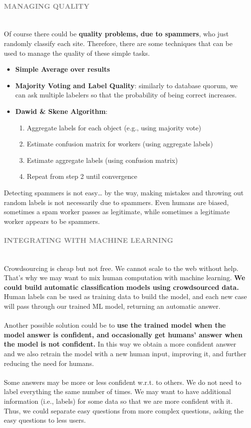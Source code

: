 \documentclass[10pt,a4paper]{article}
\newcommand{\nline}{\\~\\}
\newcommand{\myparagraph}[1]{\paragraph{\normalsize{\textcolor{gray}{\uppercase{\textbf{#1}}}} }\mbox{} \vspace{0.5em}\\}
\begin{document}
\myparagraph{Managing Quality}
Of course there could be \textbf{quality problems, due to spammers}, who just randomly classify each site. Therefore, there are some techniques that can be used to manage the quality of these simple tasks.
\begin{itemize}
	\item \textbf{Simple Average over results}
	\item \textbf{Majority Voting and Label Quality}: similarly to database quorum, we can ask multiple labelers so that the probability of being correct increases.
	\item \textbf{Dawid \& Skene Algorithm}:
	\begin{enumerate}
		\item Aggregate labels for each object (e.g., using majority vote)
		\item Estimate confusion matrix for workers (using aggregate labels)
		\item Estimate aggregate labels (using confusion matrix)
		\item Repeat from step 2 until convergence
	\end{enumerate}
\end{itemize}
Detecting spammers is not easy… by the way, making mistakes and throwing out random labels is not necessarily due to spammers. Even humans are biased, sometimes a spam worker passes as legitimate, while sometimes a legitimate worker appears to be spammers.

\myparagraph{Integrating with Machine Learning}
Crowdsourcing is cheap but not free. We cannot scale to the web without help. That’s why we may want to mix human computation with machine learning. \textbf{We could build automatic classification models using crowdsourced data.} Human labels can be used as training data to build the model, and each new case will pass through our trained ML model, returning an automatic answer.
\nline
Another possible solution could be to \textbf{use the trained model when the model answer is confident, and occasionally get humans’ answer when the model is not confident.} In this way we obtain a more confident answer and we also retrain the model with a new human input, improving it, and further reducing the need for humans.
\nline
Some answers may be more or less confident w.r.t. to others. We do not need to label everything the same number of times. We may want to have additional information (i.e., labels) for some data so that we are more confident with it. Thus, we could separate easy questions from more complex questions, asking the easy questions to less users.
\end{document}
